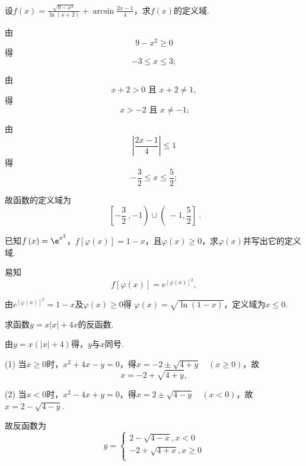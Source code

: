\begin{problem}设$\displaystyle f\left( x \right) = \frac{\sqrt{9 - x^{2}}}{\ln\left( x + 2 \right)} + \arcsin\frac{2x - 1}{4}$，求$f\left( x \right)$的定义域.
	
	\begin{solution} 由$$9 - x^{2} \geq 0$$得$$- 3 \leq x \leq 3;$$
		
		由$$x + 2 > 0 \text{ 且 } x + 2 \neq 1,$$ 得$$\ x > - 2 \text{ 且 }x \neq - 1;$$
		
		由$$\left| \frac{2x - 1}{4} \right| \leq 1$$得$$- \frac{3}{2} \leq x \leq \frac{5}{2};$$
		
		故函数的定义域为$$\left. \ \left\lbrack - \frac{3}{2} \right.\ , - 1 \right) \cup \left( \left. \  - 1,\frac{5}{2} \right\rbrack \right.\ .$$
	\end{solution}   
\end{problem}   


\begin{problem}已知$f\left( x \right) = \e^{x^{2}}$，$f\left\lbrack \varphi\left( x \right) \right\rbrack = 1 - x$，且$\varphi\left( x \right) \geq 0$，求$\varphi\left( x \right)$并写出它的定义域.
	
	\begin{solution}
		易知
		$$f\left\lbrack \varphi\left( x \right) \right\rbrack = e^{\left\lbrack \varphi\left( x \right) \right\rbrack^{2}},$$
		
		由$e^{\left\lbrack \varphi\left( x \right) \right\rbrack^{2}} = 1 - x$及$\varphi\left( x \right) \geq 0$得
		$\varphi\left( x \right) = \sqrt{\ln\left( 1 - x \right)}$，定义域为$x \leq 0$.
	\end{solution}    
\end{problem}      


\begin{problem}求函数$\displaystyle y = x\left| x \right| + 4x$的反函数.
	
	\begin{solution} 由$y = x\left( \left| x \right| + 4 \right)$得，$y$与$x$同号.
		
		(1) 当$x \geq 0$时，$x^{2} + 4x - y = 0$，得$x = - 2 \pm \sqrt{4 + y}\quad\left( x \geq 0 \right)$，故 $$x = - 2 + \sqrt{4 + y},$$
		
		(2) 当$x < 0$时，$x^{2} - 4x + y = 0$，得$x = 2 \pm \sqrt{4 - y}\quad\left( x < 0 \right)$，故 $x = 2 - \sqrt{4 - y}$.
		
		故反函数为 $$y = \left\{ \begin{matrix}
		2 - \sqrt{4 - x}, x < 0 \\-2 + \sqrt{4 + x}, x \geq 0 \\
		\end{matrix} \right.$$
	\end{solution}   
\end{problem}  



